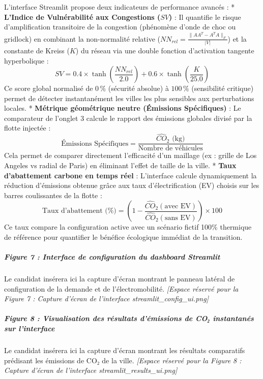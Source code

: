 \documentclass[10pt, a4paper]{article}
\begin{document}
L'interface Streamlit propose deux indicateurs de performance avancés :
* \textbf{L'Indice de Vulnérabilité aux Congestions (\(SV\))} : Il
quantifie le risque d'amplification transitoire de la congestion
(phénomène d'onde de choc ou gridlock) en combinant la non-normalité
relative (\(NN_{rel} = \frac{\|AA^T - A^TA\|_F}{|V|}\)) et la constante
de Kreiss (\(K\)) du réseau via une double fonction d'activation
tangente hyperbolique :
\[SV = 0.4 \times \tanh\left(\frac{NN_{rel}}{2.0}\right) + 0.6 \times \tanh\left(\frac{K}{25.0}\right)\]
Ce score global normalisé de \(0\,\%\) (sécurité absolue) à \(100\,\%\)
(sensibilité critique) permet de détecter instantanément les villes les
plus sensibles aux perturbations locales. * \textbf{Métrique géométrique
neutre (Émissions Spécifiques)} : Le comparateur de l'onglet 3 calcule
le rapport des émissions globales divisé par la flotte injectée :
\[\text{Émissions Spécifiques} = \frac{\widehat{CO}_2 \text{ (kg)}}{\text{Nombre de véhicules}}\]
Cela permet de comparer directement l'efficacité d'un maillage (ex :
grille de Los Angeles vs radial de Paris) en éliminant l'effet de taille
de la ville. * \textbf{Taux d'abattement carbone en temps réel} :
L'interface calcule dynamiquement la réduction d'émissions obtenue grâce
aux taux d'électrification (EV) choisis sur les barres coulissantes de
la flotte :
\[\text{Taux d'abattement (\%)} = \left( 1 - \frac{\widehat{CO}_2(\text{avec EV})}{\widehat{CO}_2(\text{sans EV})} \right) \times 100\]
Ce taux compare la configuration active avec un scénario fictif 100\%
thermique de référence pour quantifier le bénéfice écologique immédiat
de la transition.

\subparagraph{Figure 7 : Interface de configuration du dashboard
Streamlit}\label{figure-7-interface-de-configuration-du-dashboard-streamlit}

Le candidat insérera ici la capture d'écran montrant le panneau latéral
de configuration de la demande et de l'électromobilité. \emph{{[}Espace
réservé pour la Figure 7 : Capture d'écran de l'interface
streamlit\_config\_ui.png{]}}

\subparagraph{Figure 8 : Visualisation des résultats d'émissions de CO₂
instantanés sur
l'interface}\label{figure-8-visualisation-des-ruxe9sultats-duxe9missions-de-coux2082-instantanuxe9s-sur-linterface}

Le candidat insérera ici la capture d'écran montrant les résultats
comparatifs prédisant les émissions de CO₂ de la ville. \emph{{[}Espace
réservé pour la Figure 8 : Capture d'écran de l'interface
streamlit\_results\_ui.png{]}}
\end{document}
